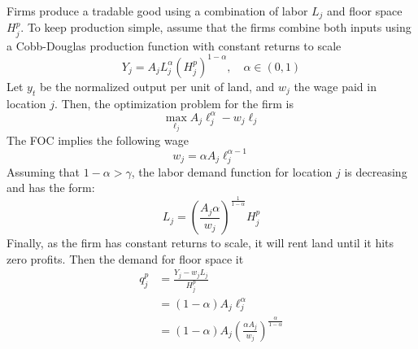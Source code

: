 \documentclass[12pt]{article}
\begin{document}
Firms produce a tradable good using a combination of labor $L_j$ and floor space $H_j^p$. To keep production simple, assume that the firms combine both inputs using a Cobb-Douglas production function with constant returns to scale
\begin{equation}
    Y_j = A_jL_j^\alpha \left(H_j^p\right)^{1-\alpha}, \quad\alpha\in(0,1)
\end{equation}
Let $y_t$ be the normalized output per unit of land, and $w_j$ the wage paid in location $j$. Then, the optimization problem for the firm is 
\begin{equation*}
    \max_{\ell_j} A_j\ell_j^\alpha - w_j\ell_j
\end{equation*}
The FOC implies the following wage
\begin{equation}
    w_j = \alpha A_j\ell_j^{\alpha-1}
\end{equation}
Assuming that $1-\alpha>\gamma$, the labor demand function for location $j$ is decreasing and has the form: 
\begin{equation*}
    L_j = \left(\frac{A_j\alpha}{w_j}\right)^{\frac{1}{1-\alpha}}H_j^p
\end{equation*}
Finally, as the firm has constant returns to scale, it will rent land until it hits zero profits. Then the demand for floor space it 
\begin{align*}
    q_j^p &= \frac{Y_j - w_jL_j}{H^p_j} \\ 
    &= (1-\alpha)A_j\ell_j^{\alpha} \\ 
    &= \boxed{(1-\alpha)A_j\left(\frac{\alpha A_j}{w_j}\right)^{\frac{\alpha}{1-\alpha}}}
\end{align*}
\end{document}
